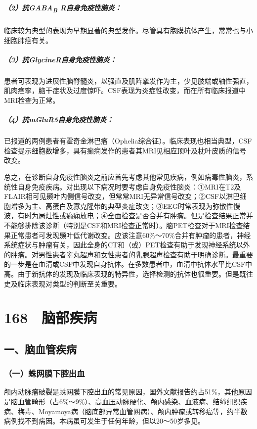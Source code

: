 \subparagraph{（2）抗GABA\textsubscript{B} R自身免疫性脑炎：}

临床较为典型的表现为早期显著的典型发作。尽管具有胞膜抗体产生，常常也与小细胞肺癌有关。

\subparagraph{（3）抗GlycineR自身免疫性脑炎：}

患者可表现为进展性脑脊髓炎，以强直及肌阵挛发作为主，少见肢端或轴性强直，肌肉痉挛，脑干症状及过度惊吓。CSF表现为炎症性改变，而在所有临床报道中MRI检查为正常。

\subparagraph{（4）抗mGluR5自身免疫性脑炎：}

已报道的两例患者有霍奇金淋巴瘤（Ophelia综合征）。临床表现也相当典型，CSF检查提示细胞数增多，具有癫痫发作的患者其MRI见相应顶叶及枕叶皮质的信号改变。

总之，在诊断自身免疫性脑炎之前应首先考虑其他常见疾病，例如病毒性脑炎，系统性自身免疫疾病。对出现以下病况时要考虑自身免疫性脑炎：①MRI在T2及FLAIR相可见颞叶内侧信号改变，但常常MRI无异常信号改变；②CSF以淋巴细胞增多为主、高蛋白及寡克隆带的典型炎症改变；③EEG时常表现为弥散性慢波，有时为局灶性或癫痫放电；④全面检查是否合并有肿瘤。但是检查结果正常并不能够排除该诊断（特别是CSF和MRI检查正常时）。脑PET检查对于MRI检查结果正常患者可发现颞叶低代谢改变。应该注意60\%～70\%合并有肿瘤的患者，神经系统症状与肿瘤有关，因此全身的CT和（或）PET检查有助于发现神经系统以外的肿瘤。对男性患者睾丸超声和女性患者的乳腺超声检查有助于明确诊断。最重要的一步是在血清或CSF中发现自身抗体。在多数患者中，血清中抗体水平比CSF中高。由于新抗体的发现及临床表现的特异性，选择检测的抗体也很重要。但是既往史及临床表现对类型的判断至关重要。

\protect\hypertarget{text00392.html}{}{}

\section{168　脑部疾病}

\subsection{一、脑血管疾病}

\subsubsection{（一）蛛网膜下腔出血}

颅内动脉瘤破裂是蛛网膜下腔出血的常见原因，国外文献报告约占51\%，其他原因是脑血管畸形（占6\%～9\%）、高血压动脉硬化、颅内感染、血液病、结缔组织疾病、梅毒、Moyamoya病（脑底部异常血管网病）、颅内肿瘤或转移癌等，约半数病例找不到病因。本病虽可发生于任何年龄，但以20～50岁多见。

